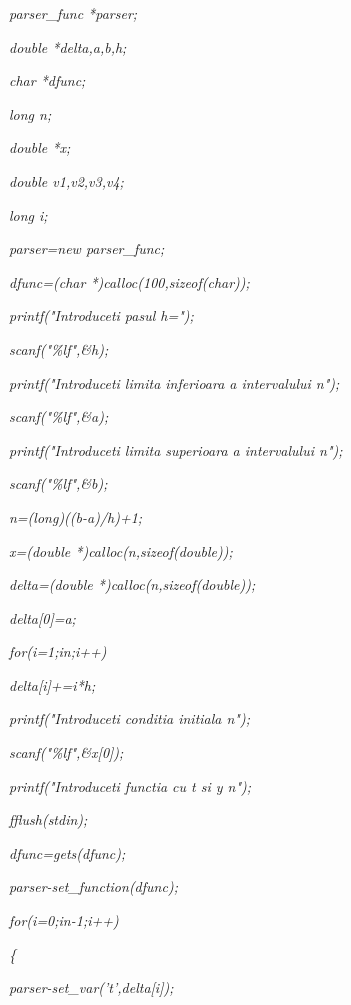 \documentclass[a4paper,twoside]{book}
\begin{document}
\textit{\qquad parser\_func *parser;}

\textit{\qquad double *delta,a,b,h;}

\textit{\qquad char *dfunc;}

\textit{\qquad long n;}

\textit{\qquad double *x;}

\textit{\qquad double v1,v2,v3,v4;}

\textit{\qquad long i;}

\textit{\qquad parser=new parser\_func;}

\textit{\qquad dfunc=(char *)calloc(100,sizeof(char));}

\textit{\qquad printf("Introduceti pasul h=");}

\textit{\qquad scanf("\%lf",\&h);}

\textit{\qquad printf("Introduceti limita inferioara a intervalului%
\TEXTsymbol{\backslash}n");}

\textit{\qquad scanf("\%lf",\&a);}

\textit{\qquad printf("Introduceti limita superioara a intervalului 
\TEXTsymbol{\backslash}n");}

\textit{\qquad scanf("\%lf",\&b);}

\textit{\qquad n=(long)((b-a)/h)+1;}

\textit{\qquad x=(double *)calloc(n,sizeof(double));}

\textit{\qquad delta=(double *)calloc(n,sizeof(double));}

\textit{\qquad delta[0]=a;}

\textit{\qquad for(i=1;i\TEXTsymbol{<}n;i++)}

\textit{\qquad \qquad delta[i]+=i*h;}

\textit{\qquad printf("Introduceti conditia initiala\TEXTsymbol{\backslash}%
n");}

\textit{\qquad scanf("\%lf",\&x[0]);}

\textit{\qquad printf("Introduceti functia cu t si y\TEXTsymbol{\backslash}%
n");}

\textit{\qquad fflush(stdin);}

\textit{\qquad dfunc=gets(dfunc);}

\textit{\qquad parser-\TEXTsymbol{>}set\_function(dfunc);}

\textit{\qquad for(i=0;i\TEXTsymbol{<}n-1;i++)}

\textit{\qquad \{}

\textit{\qquad \qquad parser-\TEXTsymbol{>}set\_var('t',delta[i]);}
\end{document}
